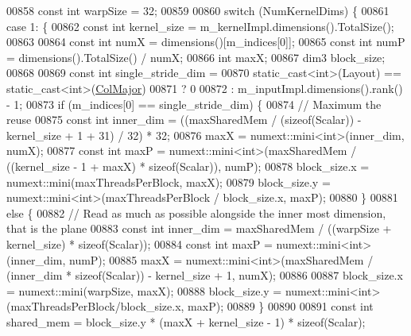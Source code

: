\begin{DoxyCode}
00858     \textcolor{keyword}{const} \textcolor{keywordtype}{int} warpSize = 32;
00859 
00860     \textcolor{keywordflow}{switch} (NumKernelDims) \{
00861       \textcolor{keywordflow}{case} 1: \{
00862         \textcolor{keyword}{const} \textcolor{keywordtype}{int} kernel\_size = m\_kernelImpl.dimensions().TotalSize();
00863 
00864         \textcolor{keyword}{const} \textcolor{keywordtype}{int} numX = dimensions()[m\_indices[0]];
00865         \textcolor{keyword}{const} \textcolor{keywordtype}{int} numP = dimensions().TotalSize() / numX;
00866         \textcolor{keywordtype}{int} maxX;
00867         dim3 block\_size;
00868 
00869         \textcolor{keyword}{const} \textcolor{keywordtype}{int} single\_stride\_dim =
00870             \textcolor{keyword}{static\_cast<}\textcolor{keywordtype}{int}\textcolor{keyword}{>}(Layout) == static\_cast<int>(\hyperlink{group__enums_ggaacded1a18ae58b0f554751f6cdf9eb13a0cbd4bdd0abcfc0224c5fcb5e4f6669a}{ColMajor})
00871                 ? 0
00872                 : m\_inputImpl.dimensions().rank() - 1;
00873         \textcolor{keywordflow}{if} (m\_indices[0] == single\_stride\_dim) \{
00874           \textcolor{comment}{// Maximum the reuse}
00875           \textcolor{keyword}{const} \textcolor{keywordtype}{int} inner\_dim = ((maxSharedMem / (\textcolor{keyword}{sizeof}(Scalar)) - kernel\_size + 1 + 31) / 32) * 32;
00876           maxX = numext::mini<int>(inner\_dim, numX);
00877           \textcolor{keyword}{const} \textcolor{keywordtype}{int} maxP = numext::mini<int>(maxSharedMem / ((kernel\_size - 1 + maxX) * \textcolor{keyword}{sizeof}(Scalar)), 
      numP);
00878           block\_size.x = numext::mini(maxThreadsPerBlock, maxX);
00879           block\_size.y = numext::mini<int>(maxThreadsPerBlock / block\_size.x, maxP);
00880         \}
00881         \textcolor{keywordflow}{else} \{
00882           \textcolor{comment}{// Read as much as possible alongside the inner most dimension, that is the plane}
00883           \textcolor{keyword}{const} \textcolor{keywordtype}{int} inner\_dim = maxSharedMem / ((warpSize + kernel\_size) * \textcolor{keyword}{sizeof}(Scalar));
00884           \textcolor{keyword}{const} \textcolor{keywordtype}{int} maxP = numext::mini<int>(inner\_dim, numP);
00885           maxX = numext::mini<int>(maxSharedMem / (inner\_dim * \textcolor{keyword}{sizeof}(Scalar)) - kernel\_size + 1, numX);
00886 
00887           block\_size.x = numext::mini(warpSize, maxX);
00888           block\_size.y = numext::mini<int>(maxThreadsPerBlock/block\_size.x, maxP);
00889         \}
00890 
00891         \textcolor{keyword}{const} \textcolor{keywordtype}{int} shared\_mem = block\_size.y * (maxX + kernel\_size - 1) * \textcolor{keyword}{sizeof}(Scalar);

\end{DoxyCode}
